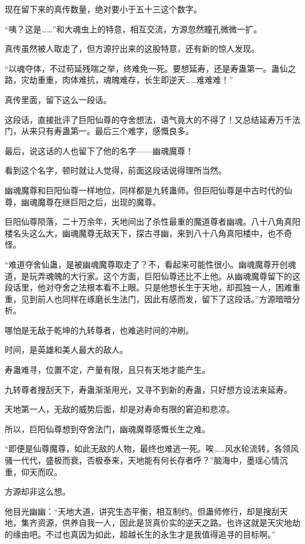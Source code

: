 \begin{this_body}
现在留下来的真传数量，绝对要小于五十三这个数字。

“咦？这是……”和大魂虫上的特意，相互交流，方源忽然瞳孔微微一扩。

真传虽然被人取走了，但方源拧出来的这股特意，还有新的惊人发现。

“以魂夺体，不过苟延残喘之举，终难免一死。要想延寿，还是寿蛊第一。蛊仙之路，灾劫重重，肉体难抗，魂魄难存，长生即逆天……难难难！”

真传里面，留下这么一段话。

这段话，直接批评了巨阳仙尊的夺舍想法，语气竟大的不得了！又总结延寿万千法门，从来只有寿蛊第一。最后三个难字，感慨良多。

最后，说这话的人也留下了他的名字——幽魂魔尊！

看到这个名字，顿时就让人觉得，前面这段话说得理所当然。

幽魂魔尊和巨阳仙尊一样地位，同样都是九转蛊师。但巨阳仙尊是中古时代的仙尊，幽魂魔尊在继巨阳之后，出现的魔尊。

巨阳仙尊陨落，二十万余年，天地间出了杀性最重的魔道尊者幽魂。八十八角真阳楼名头这么大，幽魂魔尊无敌天下，探古寻幽，来到八十八角真阳楼中，也不奇怪。

“难道夺舍仙蛊，是被幽魂魔尊取走了？不，看起来可能性很小。幽魂魔尊开创魂道，是玩弄魂魄的大行家。这个方面，巨阳仙尊还比不上他。从幽魂魔尊留下的这段话里，他对夺舍之法根本看不上眼。只是他想长生于天地，却孤独一人，困难重重，见到前人也同样在琢磨长生法门，因此有感而发，留下了这段话。”方源暗暗分析。

哪怕是无敌于乾坤的九转尊者，也难逃时间的冲刷。

时间，是英雄和美人最大的敌人。

寿蛊难寻，位置不定，产量有限，且只有天地才能产生。

九转尊者搜刮天下，寿蛊渐渐用光，又寻不到新的寿蛊，只好想方设法来延寿。

天地第一人，无敌的威势后面，却是对寿命有限的窘迫和悲凉。

所以，巨阳仙尊想到夺舍法门，幽魂魔尊感慨长生之难。

“即便是仙尊魔尊，如此无敌的人物，最终也难逃一死。唉……风水轮流转，各领风骚一代代，盛极而衰，否极泰来，天地能有何长存者呼？”脑海中，墨瑶心情沉重，仰天而叹。

方源却非这么想。

他目光幽幽：“天地大道，讲究生态平衡，相互制约。但蛊师修行，却是搜刮天地，集齐资源，供养自我一人，因此是货真价实的逆天之路。也许这就是天灾地劫的缘由吧。不过也真因为如此，超越长生的永生才是我值得追寻的目标啊。”


\end{this_body}
